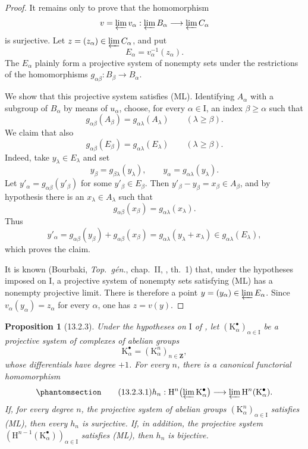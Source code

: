 \documentclass[oneside]{amsart}
\theoremstyle{ega-env-style}
\theoremstyle{ega-thm-env-style}
\newtheorem*{proposition}{Proposition}
\theoremstyle{ega-defn-env-style}
\def\bb{\mathbf}                    %
\def\geq{\geqslant}                 %
\def\HH{\mathrm{H}}                 %
\let\EGAOriginalLabel\label
\renewcommand{\label}[1]{\phantomsection\EGAOriginalLabel{#1}}
\begin{document}
\begin{proof}
It remains only to prove that the homomorphism
\[
  v=\varprojlim v_\alpha:
  \varprojlim B_\alpha\longrightarrow\varprojlim C_\alpha
\]
is surjective.
Let $z=(z_\alpha)\in\varprojlim C_\alpha$, and put
\[
  E_\alpha=v_\alpha^{-1}(z_\alpha).
\]
The $E_\alpha$ plainly form a projective system of nonempty sets under
the restrictions of the homomorphisms
$g_{\alpha\beta}:B_\beta\longrightarrow B_\alpha$.

We show that this projective system satisfies (ML).
Identifying $A_\alpha$ with a subgroup of $B_\alpha$ by means of
$u_\alpha$, choose, for every $\alpha\in\mathrm{I}$, an index
$\beta\geq\alpha$ such that
\[
  g_{\alpha\beta}(A_\beta)
  =
  g_{\alpha\lambda}(A_\lambda)
  \qquad(\lambda\geq\beta).
\]
We claim that also
\[
  g_{\alpha\beta}(E_\beta)
  =
  g_{\alpha\lambda}(E_\lambda)
  \qquad(\lambda\geq\beta).
\]
Indeed, take $y_\lambda\in E_\lambda$ and set
\[
  y_\beta=g_{\beta\lambda}(y_\lambda),
  \qquad
  y_\alpha=g_{\alpha\lambda}(y_\lambda).
\]
Let $y'_\alpha=g_{\alpha\beta}(y'_\beta)$ for some
$y'_\beta\in E_\beta$.
Then $y'_\beta-y_\beta=x_\beta\in A_\beta$, and by hypothesis there
is an $x_\lambda\in A_\lambda$ such that
\[
  g_{\alpha\beta}(x_\beta)
  =
  g_{\alpha\lambda}(x_\lambda).
\]
Thus
\[
  y'_\alpha
  =
  g_{\alpha\beta}(y_\beta)+g_{\alpha\beta}(x_\beta)
  =
  g_{\alpha\lambda}(y_\lambda+x_\lambda)
  \in g_{\alpha\lambda}(E_\lambda),
\]
which proves the claim.

It is known (Bourbaki, \emph{Top.\ g\'{e}n.}, chap.~II,
, th.~1) that, under the hypotheses imposed on
$\mathrm{I}$, a projective system of nonempty sets satisfying (ML)
has a nonempty projective limit.
There is therefore a point
$y=(y_\alpha)\in\varprojlim E_\alpha$.
Since $v_\alpha(y_\alpha)=z_\alpha$ for every $\alpha$, one has
$z=v(y)$.
\end{proof}

\begin{proposition}[13.2.3]
\label{0.13.2.3}
Under the hypotheses on $\mathrm{I}$ of , let
$(\mathrm{K}^\bullet_\alpha)_{\alpha\in\mathrm{I}}$ be a projective
system of complexes of abelian groups
\[
  \mathrm{K}^\bullet_\alpha
  =
  (\mathrm{K}^n_\alpha)_{n\in\bb{Z}},
\]
whose differentials have degree $+1$.
For every $n$, there is a canonical functorial homomorphism
\begin{equation}
\label{0.13.2.3.1}
\tag{13.2.3.1}
  h_n:
  \HH^n\bigl(\varprojlim\mathrm{K}^\bullet_\alpha\bigr)
  \longrightarrow
  \varprojlim\HH^n(\mathrm{K}^\bullet_\alpha).
\end{equation}
If, for every degree $n$, the projective system of abelian groups
$(\mathrm{K}^n_\alpha)_{\alpha\in\mathrm{I}}$ satisfies {\rm(ML)},
then every $h_n$ is surjective.
If, in addition, the projective system
$(\HH^{n-1}(\mathrm{K}^\bullet_\alpha))_{\alpha\in\mathrm{I}}$
satisfies {\rm(ML)}, then $h_n$ is bijective.
\end{proposition}
\end{document}
